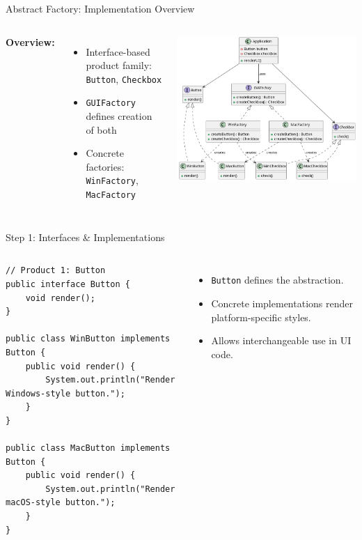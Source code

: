 \documentclass[aspectratio=169, table]{beamer}
\begin{document}
\begin{frame}[fragile]{Abstract Factory: Implementation Overview}
\vspace{5pt}
\begin{columns}[T]
\textbf{Overview:}
\begin{itemize}
\item Interface-based product family: \texttt{Button}, \texttt{Checkbox}
\item \texttt{GUIFactory} defines creation of both
\item Concrete factories: \texttt{WinFactory}, \texttt{MacFactory}
\end{itemize}

\includegraphics[width=\linewidth]{../../figures/out/factory_abstract.png}
\end{columns}
\end{frame}

\begin{frame}[fragile]{Step 1: Interfaces \& Implementations}
\vspace{20pt}
\begin{columns}[T]
\begin{lstlisting}[style=JavaStyle]
// Product 1: Button
public interface Button {
	void render();
}

public class WinButton implements Button {
	public void render() {
		System.out.println("Render Windows-style button.");
	}
}

public class MacButton implements Button {
	public void render() {
		System.out.println("Render macOS-style button.");
	}
}
\end{lstlisting}

\begin{itemize}
\item \texttt{Button} defines the abstraction.
\item Concrete implementations render platform-specific styles.
\item Allows interchangeable use in UI code.
\end{itemize}
\end{columns}
\end{frame}
\end{document}
